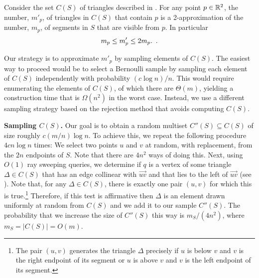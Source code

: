 \documentclass{patmorin}
\begin{document}
Consider the set $C(S)$ of triangles described in .
For any point $p\in\mathbb{R}^2$, the number, $m'_p$, of triangles in $C(S)$ that
contain $p$ is a 2-approximation of the number, $m_p$,  of segments in $S$
that are visible from $p$.  In particular
\begin{equation}
  m_p \le m'_p \le 2m_p.  \enspace . \eqlabel{mpmp}
\end{equation}

Our strategy is to approximate $m'_p$ by sampling elements of
$C(S)$.  The easiest way to proceed would be to select a Bernoulli sample
by sampling each element of $C(S)$ independently with probability $(c\log
n)/n$.  This would require enumerating the elements of
$C(S)$, of which there are $\Theta(m)$, yielding a construction time that
is $\Omega(n^2)$ in the worst case.  Instead, we use a different sampling
strategy based on the rejection method that avoids computing $C(S)$. \smallbreak

\noindent\textbf{Sampling $C(S)$.}
Our goal is to obtain a random multiset $C''(S)\subseteq C(S)$ of size
roughly $c(m/n)\log n$.  To achieve this, we repeat the following
procedure $4cn\log n$ times:  We select two points $u$ and $v$ at random,
with replacement, from the $2n$ endpoints of $S$.  Note that there are
$4n^2$ ways of doing this.  Next, using $O(1)$ ray sweeping queries,
we determine if $q$ is a vertex of some triangle $\Delta\in C(S)$ that
has an edge collinear with $\overrightarrow{uv}$ and that lies to the
left of $\overrightarrow{uv}$ (see ).  Note that,
for any $\Delta\in C(S)$, there is exactly one pair $(u,v)$ for which
this is true.\footnote{The pair $(u,v)$ generates the triangle $\Delta$
precisely if $u$ is below $v$ and $v$ is the right endpoint of its
segment or $u$ is above $v$ and $v$ is the left endpoint of its segment.}
Therefore, if this test is affirmative then $\Delta$ is an element drawn
uniformly at random from $C(S)$ and we add it to our sample $C''(S)$.
The probability that we increase the size of $C''(S)$ this way is
$m_S/(4n^2)$, where $m_S=|C(S)|=O(m)$. \smallbreak

\end{document}
